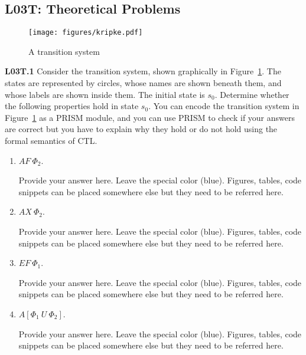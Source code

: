\documentclass[12pt,a4paper]{article}
\begin{document}
\clearpage

\subsection*{L03T: Theoretical Problems}
\begin{figure}[h]
\begin{center}
\texttt{[image: figures/kripke.pdf]}
\end{center}
\caption{A transition system}
\label{fig:kripke}
\end{figure}
\begin{description}
\item{\bf L03T.1} Consider the transition system, shown graphically in Figure~\ref{fig:kripke}. The states are represented by circles, whose names are
shown beneath them, and whose labels are shown inside them. The initial state is $s_0$. Determine whether the following properties hold
in state $s_0$. You can encode the transition system in Figure~\ref{fig:kripke} as a PRISM module, and you can use PRISM to check if your answers are correct but you have to explain why they hold or do not hold using the formal semantics of CTL. 
\begin{enumerate}[label=\alph*)]

\item $AF\ \Phi_2$.
%
\ifwithanswers
\color{blue}
\par
Provide your answer here. Leave the special color (blue). Figures, tables, code snippets can be placed somewhere else but they need to be referred here.
\color{black}
\fi
%
\item $AX\ \Phi_2$.
%
\ifwithanswers
\color{blue}
\par
Provide your answer here. Leave the special color (blue). Figures, tables, code snippets can be placed somewhere else but they need to be referred here.
\color{black}
\fi
%
\item $EF\ \Phi_1$.
%
\ifwithanswers
\color{blue}
\par
Provide your answer here. Leave the special color (blue). Figures, tables, code snippets can be placed somewhere else but they need to be referred here.
\color{black}
\fi
%
\item $A[\Phi_1\ U\ \Phi_2]$.
%
\ifwithanswers
\color{blue}
\par
Provide your answer here. Leave the special color (blue). Figures, tables, code snippets can be placed somewhere else but they need to be referred here.
\color{black}
\fi
%


\end{enumerate}
\end{description}
\end{document}

